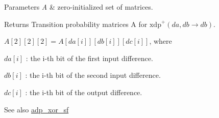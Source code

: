 \begin{DoxyParams}{\-Parameters}
{\em \-A} & zero-\/initialized set of matrices. \\
\hline
\end{DoxyParams}
\begin{DoxyReturn}{\-Returns}
\-Transition probability matrices \-A for $\mathrm{xdp}^{+}(da,db \rightarrow db)$.
\end{DoxyReturn}
$A[2][2][2] = A[da[i]][db[i]][dc[i]]$, where


\begin{DoxyItemize}
\item $da[i]$ \-: the i-\/th bit of the first input difference.
\item $db[i]$ \-: the i-\/th bit of the second input difference.
\item $dc[i]$ \-: the i-\/th bit of the output difference. \begin{DoxySeeAlso}{\-See also}
\hyperlink{adp-xor_8hh_a42dda78d01cbb1a68263d971c1ab63ea}{adp\-\_\-xor\-\_\-sf} 
\end{DoxySeeAlso}

\end{DoxyItemize}